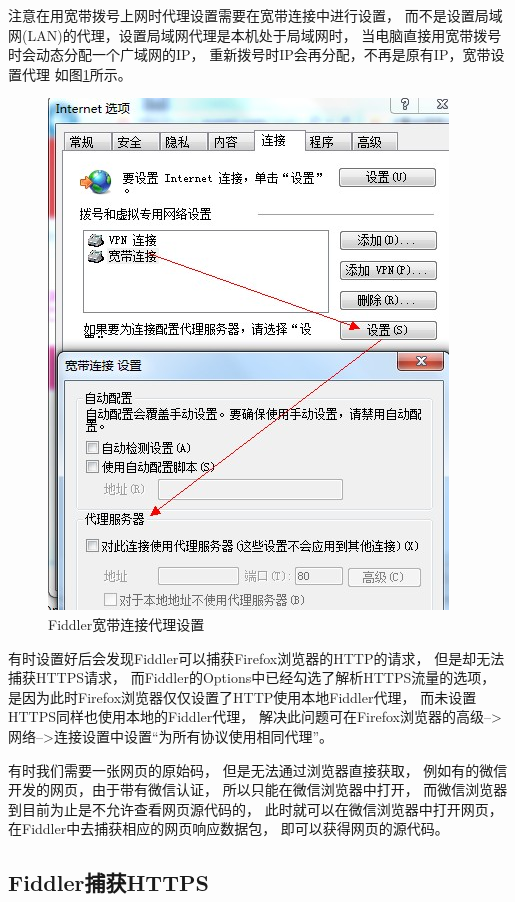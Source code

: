 \documentclass{book}
\begin{document}
注意在用宽带拨号上网时代理设置需要在宽带连接中进行设置，
而不是设置局域网(LAN)的代理，设置局域网代理是本机处于局域网时，
当电脑直接用宽带拨号时会动态分配一个广域网的IP，
重新拨号时IP会再分配，不再是原有IP，宽带设置代理
如图\ref{fig:BrandwithProxySetting}所示。

\begin{figure}[htbp]
	\centering
	\includegraphics[scale=0.5]{BrandwithProxySetting.jpg}
	\caption{Fiddler宽带连接代理设置}
	\label{fig:BrandwithProxySetting}
\end{figure}

有时设置好后会发现Fiddler可以捕获Firefox浏览器的HTTP的请求，
但是却无法捕获HTTPS请求，
而Fiddler的Options中已经勾选了解析HTTPS流量的选项，
是因为此时Firefox浏览器仅仅设置了HTTP使用本地Fiddler代理，
而未设置HTTPS同样也使用本地的Fiddler代理，
解决此问题可在Firefox浏览器的高级-->网络-->连接设置中设置“为所有协议使用相同代理”。

有时我们需要一张网页的原始码，
但是无法通过浏览器直接获取，
例如有的微信开发的网页，由于带有微信认证，
所以只能在微信浏览器中打开，
而微信浏览器到目前为止是不允许查看网页源代码的，
此时就可以在微信浏览器中打开网页，
在Fiddler中去捕获相应的网页响应数据包，
即可以获得网页的源代码。

\subsection{Fiddler捕获HTTPS}
\end{document}
